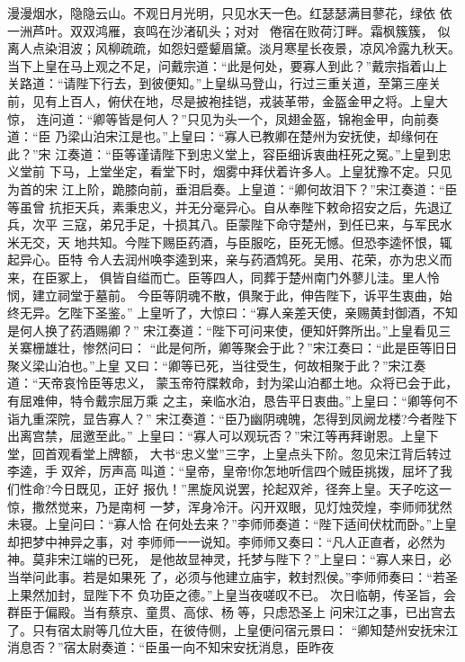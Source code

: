 漫漫烟水，隐隐云山。不观日月光明，只见水天一色。红瑟瑟满目蓼花，绿依
依一洲芦叶。双双鸿雁，哀鸣在沙渚矶头；对对，倦宿在败荷汀畔。霜枫簇簇，
似离人点染泪波；风柳疏疏，如怨妇蹙颦眉黛。淡月寒星长夜景，凉风冷露九秋天。
当下上皇在马上观之不足，问戴宗道：“此是何处，要寡人到此？”戴宗指着山上
关路道：“请陛下行去，到彼便知。”上皇纵马登山，行过三重关道，至第三座关
前，见有上百人，俯伏在地，尽是披袍挂铠，戎装革带，金盔金甲之将。上皇大惊，
连问道：“卿等皆是何人？”只见为头一个，凤翅金盔，锦袍金甲，向前奏道：“臣
乃梁山泊宋江是也。”上皇曰：“寡人已教卿在楚州为安抚使，却缘何在此？”宋
江奏道：“臣等谨请陛下到忠义堂上，容臣细诉衷曲枉死之冤。”上皇到忠义堂前
下马，上堂坐定，看堂下时，烟雾中拜伏着许多人。上皇犹豫不定。只见为首的宋
江上阶，跪膝向前，垂泪启奏。上皇道：“卿何故泪下？”宋江奏道：“臣等虽曾
抗拒天兵，素秉忠义，并无分毫异心。自从奉陛下敕命招安之后，先退辽兵，次平
三寇，弟兄手足，十损其八。臣蒙陛下命守楚州，到任已来，与军民水米无交，天
地共知。今陛下赐臣药酒，与臣服吃，臣死无憾。但恐李逵怀恨，辄起异心。臣特
令人去润州唤李逵到来，亲与药酒鸩死。吴用、花荣，亦为忠义而来，在臣冢上，
俱皆自缢而亡。臣等四人，同葬于楚州南门外蓼儿洼。里人怜悯，建立祠堂于墓前。
今臣等阴魂不散，俱聚于此，伸告陛下，诉平生衷曲，始终无异。乞陛下圣鉴。”
上皇听了，大惊曰：“寡人亲差天使，亲赐黄封御酒，不知是何人换了药酒赐卿？”
宋江奏道：“陛下可问来使，便知奸弊所出。”上皇看见三关寨栅雄壮，惨然问曰：
“此是何所，卿等聚会于此？”宋江奏曰：“此是臣等旧日聚义梁山泊也。”上皇
又曰：“卿等已死，当往受生，何故相聚于此？”宋江奏道：“天帝哀怜臣等忠义，
蒙玉帝符牒敕命，封为梁山泊都土地。众将已会于此，有屈难伸，特令戴宗屈万乘
之主，亲临水泊，恳告平日衷曲。”上皇曰：“卿等何不诣九重深院，显告寡人？”
宋江奏道：“臣乃幽阴魂魄，怎得到凤阙龙楼?今者陛下出离宫禁，屈邀至此。”
上皇曰：“寡人可以观玩否？”宋江等再拜谢恩。上皇下堂，回首观看堂上牌额，
大书“忠义堂”三字，上皇点头下阶。忽见宋江背后转过李逵，手双斧，厉声高
叫道：“皇帝，皇帝!你怎地听信四个贼臣挑拨，屈坏了我们性命?今日既见，正好
报仇！”黑旋风说罢，抡起双斧，径奔上皇。天子吃这一惊，撒然觉来，乃是南柯
一梦，浑身冷汗。闪开双眼，见灯烛荧煌，李师师犹然未寝。上皇问曰：“寡人恰
在何处去来？”李师师奏道：“陛下适间伏枕而卧。”上皇却把梦中神异之事，对
李师师一一说知。李师师又奏曰：“凡人正直者，必然为神。莫非宋江端的已死，
是他故显神灵，托梦与陛下？”上皇曰：“寡人来日，必当举问此事。若是如果死
了，必须与他建立庙宇，敕封烈侯。”李师师奏曰：“若圣上果然加封，显陛下不
负功臣之德。”上皇当夜嗟叹不已。
次日临朝，传圣旨，会群臣于偏殿。当有蔡京、童贯、高俅、杨等，只虑恐圣上
问宋江之事，已出宫去了。只有宿太尉等几位大臣，在彼侍侧，上皇便问宿元景曰：
“卿知楚州安抚宋江消息否？”宿太尉奏道：“臣虽一向不知宋安抚消息，臣昨夜
